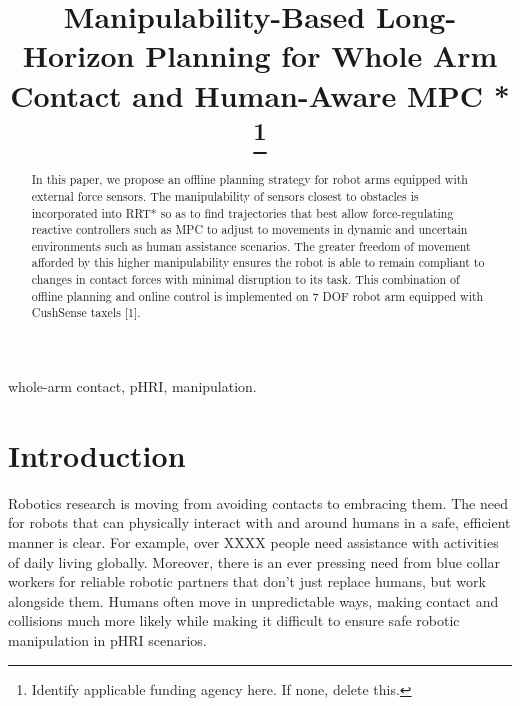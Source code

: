 \documentclass[conference]{IEEEtran}
\begin{document}
\title{Manipulability-Based Long-Horizon Planning for Whole Arm Contact and Human-Aware MPC
*\\

\thanks{Identify applicable funding agency here. If none, delete this.}
}

\author{
}

\maketitle

\begin{abstract}
In this paper, we propose an offline planning strategy for robot arms 
equipped with external force sensors. The manipulability of sensors 
closest to obstacles is incorporated into RRT* so as to find trajectories 
that best allow force-regulating reactive controllers such as MPC to adjust 
to movements in dynamic and uncertain environments such as human assistance 
scenarios. The greater freedom of movement afforded by this higher manipulability 
ensures the robot is able to remain compliant to changes in contact forces with 
minimal disruption to its task. This combination of offline planning and online 
control is implemented on 7 DOF robot arm equipped with CushSense taxels [1].
\end{abstract}

\begin{IEEEkeywords}
whole-arm contact, pHRI, manipulation.
\end{IEEEkeywords}

\section{Introduction}
Robotics research is moving from avoiding contacts to embracing them. The need for robots that can physically interact with and around humans in a safe, efficient manner is clear. For example, over XXXX people need assistance with activities of daily living globally. Moreover, there is an ever pressing need from blue collar workers for reliable robotic partners that don’t just replace humans, but work alongside them. Humans often move in unpredictable ways, making contact and collisions much more likely while making it difficult to ensure safe robotic manipulation in pHRI scenarios.
\end{document}
